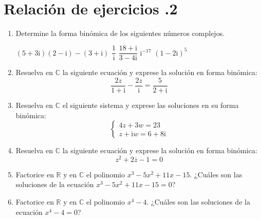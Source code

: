 \newpage



\thispagestyle{empty}

\ 

\vfill
\newpage

\section*{Relación de ejercicios \thechapter.2}

\pagestyle{relaciones}

\begin{enumerate}

\item
Determine la forma binómica de los siguientes números complejos.
\setcontadoralph
\begin{centrar}
\nitem
$(5 + 3\mathrm{i})(2-\mathrm{i})-(3+\mathrm{i})$
\hfill
\nitem
$\dfrac1{\mathrm{i}}$
\hfill
\nitem
$\dfrac{18+\mathrm{i}}{3-4\mathrm{i}}$
\hfill
\nitem
$\mathrm{i}^{-17}$
\hfill
\nitem
$(1-2\mathrm{i})^5$
\end{centrar}


\item
Resuelva en $\mathbb{C}$ la siguiente ecuación y exprese la solución en forma binómica:
\[
\dfrac{2z}{1+\mathrm{i}}-\dfrac{2z}{\mathrm{i}} = \dfrac{5}{2+\mathrm{i}}
\]


\item
Resuelva en $\mathbb{C}$ el siguiente sistema y exprese las soluciones en su forma binómica:
\[\left\{\begin{array}{ll}
4z+3w=23\\
z+\mathrm{i} w=6+8\mathrm{i}
\end{array}\right.\]

\item
Resuelva en $\mathbb{C}$ la siguiente ecuación y exprese la solución en forma binómica:
\[
z^2+2\overline{z}-1=0
\]


\item
Factorice en $\mathbb{R}$ y en $\mathbb{C}$ el polinomio $x^3-5x^2+11x-15$.
¿Cuáles son las soluciones de la ecuación $x^3-5x^2+11x-15=0$?

\item
Factorice en $\mathbb{R}$ y en $\mathbb{C}$ el polinomio $x^4-4$.
¿Cuáles son las soluciones de la ecuación $x^4-4=0$?


\end{enumerate}
